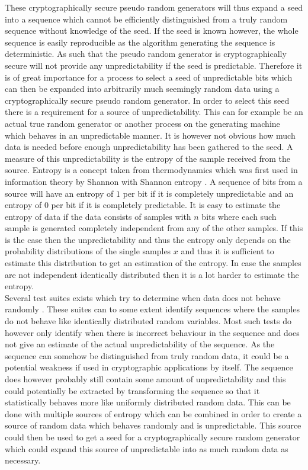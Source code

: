 \documentclass[a4paper,11pt]{report}
\begin{document}
\noindent
These cryptographically secure pseudo random generators will thus 
expand a seed into a sequence which cannot be efficiently distinguished 
from a truly random sequence without knowledge of the seed. If the seed is 
known however, the whole sequence is easily reproducible as the algorithm 
generating the sequence is deterministic. As such that the pseudo random
generator is cryptographically secure will not provide any unpredictability if 
the seed is predictable. Therefore it is of great importance for a process to 
select a seed of unpredictable bits which can then be expanded into arbitrarily
much seemingly random data using a cryptographically secure pseudo random 
generator. In order to select
this seed there is a requirement for a source of unpredictability. This can
for example be an actual true random generator or another process on the 
generating machine which behaves in an unpredictable manner. It is however not
obvious how much data is needed before enough unpredictability has been 
gathered to the seed. A measure of this unpredictability is the entropy of 
the sample received from the source.  Entropy is a concept taken from 
thermodynamics which was first used in information theory by Shannon 
with Shannon entropy \cite{Shannon:2001:MTC:584091.584093}.
A sequence of bits from a source will have an entropy of $1$ per bit if
it is completely unpredictable and an entropy of $0$ per bit if it is 
completely predictable. It is easy to estimate the entropy of 
data if the data consists of samples with $n$ bits where each such sample is
generated completely independent from any of the other samples. If this is the 
case then the unpredictability and thus the entropy only depends on the 
probability distributions of the single samples $x$ and thus it is sufficient
to estimate this distribution to get an estimation of the entropy.
In case the samples are not independent identically distributed then it 
is a lot harder to estimate the entropy. \\

\noindent
Several test suites exists which try to determine when data does not behave 
randomly\cite{Bassham:2010:SRS:2206233}
\cite{brown2017dieharder}\cite{Ecuyer2007}. These suites can to some extent 
identify sequences where the samples do not behave like identically distributed
random variables. Most such tests do however only identify when there is 
incorrect behaviour in the sequence and does not give an estimate of the actual
unpredictability of the sequence. As the sequence can somehow be distinguished 
from truly random data, it could be a potential weakness if used in 
cryptographic applications by itself. The sequence does however probably still
contain some amount of unpredictability and this could potentially be extracted
by transforming the sequence so that it statistically behaves more like 
uniformly distributed random data. 
This can be done with multiple sources of entropy which can be combined 
in order to create a source of random data which behaves randomly and is 
unpredictable. This source could then be used to get a seed for a
cryptographically secure random generator which could expand this source of 
unpredictable into as much random data as necessary.\\
\end{document}
